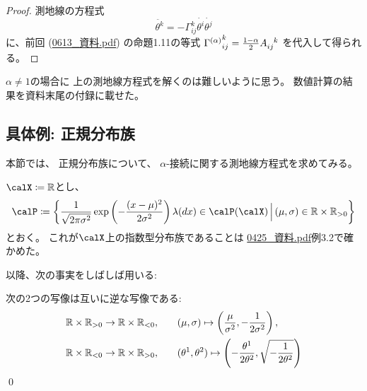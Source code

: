 \documentclass[report]{jlreq}
\begin{document}
\begin{proof}
    測地線の方程式
    \begin{equation}
        \ddot{\theta^k}
            = - \Gamma_{ij}^k \dot{\theta^i} \dot{\theta^j}
    \end{equation}
    に、前回 (\url{0613_資料.pdf}) の命題1.11の等式
    ${\Gamma^{(\alpha)}}_{ij}^k = \frac{1 - \alpha}{2} A_{ij}^{\hphantom{ij}k}$
    を代入して得られる。
\end{proof}

$\alpha \neq 1$の場合に
上の測地線方程式を解くのは難しいように思う。
数値計算の結果を資料末尾の付録に載せた。


%
\subsection{具体例: 正規分布族}

本節では、
正規分布族について、
$\alpha$-接続に関する測地線方程式を求めてみる。

\begin{settings}[正規分布族]
    $\calX \coloneqq \R$とし、
    \begin{equation}
        \calP \coloneqq \mybrace{
            \frac{1}{\sqrt{2 \pi \sigma^2}}
            \exp\myparen{
                - \frac{(x - \mu)^2}{2 \sigma^2}
            }
            \lambda(dx)
            \in \calP(\calX)
            \, \Big| \,
            (\mu, \sigma) \in \R \times \R_{> 0}
        }
    \end{equation}
    とおく。
    これが$\calX$上の指数型分布族であることは
    \url{0425_資料.pdf}例3.2で確かめた。
\end{settings}

以降、次の事実をしばしば用いる:

\begin{fact}
    次の2つの写像は互いに逆な{\smooth}写像である:
    \begin{alignat}{1}
        \mathbb{R} \times \mathbb{R}_{> 0} \to \mathbb{R} \times \mathbb{R}_{< 0},
            \qquad
            &(\mu, \sigma)
            \mapsto
            \left({
                \frac{\mu}{\sigma^2},
                - \frac{1}{2\sigma^2}
            }\right),
            \\
        \mathbb{R} \times \mathbb{R}_{< 0} \to \mathbb{R} \times \mathbb{R}_{> 0},
            \qquad
            &(\theta^1, \theta^2)
            \mapsto
            \left({
                - \frac{\theta^1}{2\theta^2},
                \sqrt{- \frac{1}{2\theta^2}}
            }\right)
    \end{alignat}
    \qed
\end{fact}
\end{document}

